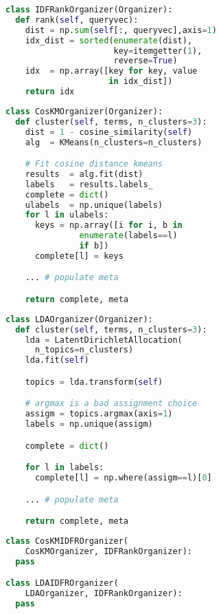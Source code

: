 \documentclass[11pt]{article}
\begin{document}
\begin{multicols}{2}

\begin{lstlisting}[language=Python]
class IDFRankOrganizer(Organizer):
  def rank(self, queryvec):
    dist = np.sum(self[:, queryvec],axis=1)
    idx_dist = sorted(enumerate(dist),
                      key=itemgetter(1),
                      reverse=True)
    idx  = np.array([key for key, value
                     in idx_dist])
    return idx
\end{lstlisting}

\begin{lstlisting}[language=Python]
class CosKMOrganizer(Organizer):
  def cluster(self, terms, n_clusters=3):
    dist = 1 - cosine_similarity(self)
    alg  = KMeans(n_clusters=n_clusters)

    # Fit cosine distance kmeans
    results  = alg.fit(dist)
    labels   = results.labels_
    complete = dict()
    ulabels  = np.unique(labels)
    for l in ulabels:
      keys = np.array([i for i, b in
               enumerate(labels==l)
               if b])
      complete[l] = keys

    ... # populate meta

    return complete, meta

\end{lstlisting}

\columnbreak

\begin{lstlisting}[language=Python]
class LDAOrganizer(Organizer):
  def cluster(self, terms, n_clusters=3):
    lda = LatentDirichletAllocation(
      n_topics=n_clusters)
    lda.fit(self)

    topics = lda.transform(self)

    # argmax is a bad assignment choice
    assigm = topics.argmax(axis=1)
    labels = np.unique(assigm)

    complete = dict()

    for l in labels:
      complete[l] = np.where(assigm==l)[0]

    ... # populate meta

    return complete, meta
\end{lstlisting}

\begin{lstlisting}[language=Python]
class CosKMIDFROrganizer(
    CosKMOrganizer, IDFRankOrganizer):
  pass

class LDAIDFROrganizer(
    LDAOrganizer, IDFRankOrganizer):
  pass
\end{lstlisting}

\end{multicols}
\end{document}
